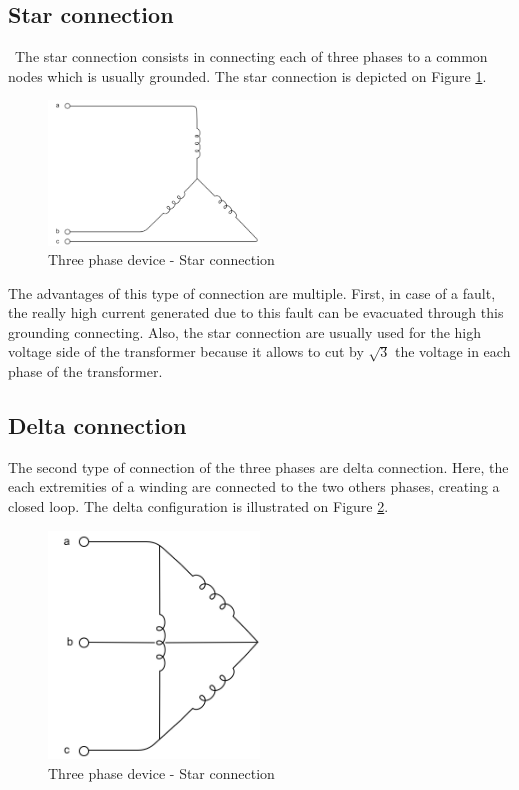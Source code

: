 \documentclass[12pt,a4paper]{report}
\begin{document}
\subsection{Star connection}
\quad\, The star connection consists in connecting each of three phases to a common nodes which is usually grounded. The star connection is depicted on Figure \ref{fig:star}.
\begin{figure}[h]
    \centering
    \includegraphics[width=0.5\textwidth]{Star.png}
    \caption{Three phase device - Star connection}
    \label{fig:star}
\end{figure}

The advantages of this type of connection are multiple. First, in case of a fault, the really high current generated due to this fault can be evacuated through this grounding connecting. Also, the star connection are usually used for the high voltage side of the transformer because it allows to cut by $\sqrt{3}$ the voltage in each phase of the transformer.

\subsection{Delta connection}
The second type of connection of the three phases are delta connection. Here, the each extremities of a winding are connected to the two others phases, creating a closed loop. The delta configuration is illustrated on Figure \ref{fig:delta}.

\begin{figure}[h]
    \centering
    \includegraphics[width=0.5\textwidth]{Delta.png}
    \caption{Three phase device - Star connection}
    \label{fig:delta}
\end{figure}
\end{document}
